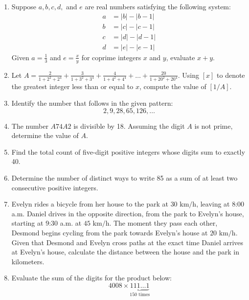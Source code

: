 \documentclass{article}
\begin{document}
\begin{enumerate}
    \item Suppose $a, b, c, d,$ and $e$ are real numbers satisfying the following system:
    \begin{align*}
        a &= |b| - |b-1| \\
        b &= |c| - |c-1| \\
        c &= |d| - |d-1| \\
        d &= |e| - |e-1|
    \end{align*}
    Given $a = \frac{1}{3}$ and $e = \frac{x}{y}$ for coprime integers $x$ and $y$, evaluate $x+y$.

    \item Let $A = \frac{2}{1+2^2+2^4} + \frac{3}{1+3^2+3^4} + \frac{4}{1+4^2+4^4} + \dots + \frac{20}{1+20^2+20^4}$. Using $[x]$ to denote the greatest integer less than or equal to $x$, compute the value of $[1/A]$.

    \item Identify the number that follows in the given pattern:
    \[ 2, 9, 28, 65, 126, \dots \]

    \item The number $A74A2$ is divisible by 18. Assuming the digit $A$ is not prime, determine the value of $A$.

    \item Find the total count of five-digit positive integers whose digits sum to exactly 40.

    \item Determine the number of distinct ways to write 85 as a sum of at least two consecutive positive integers.

    \item Evelyn rides a bicycle from her house to the park at $30\text{ km/h}$, leaving at 8:00 a.m. Daniel drives in the opposite direction, from the park to Evelyn's house, starting at 9:30 a.m. at $45\text{ km/h}$. The moment they pass each other, Desmond begins cycling from the park towards Evelyn's house at $20\text{ km/h}$. Given that Desmond and Evelyn cross paths at the exact time Daniel arrives at Evelyn's house, calculate the distance between the house and the park in kilometers.

    \item Evaluate the sum of the digits for the product below:
    \[ 4008 \times \underbrace{111\dots1}_{150 \text{ times}} \]


\end{enumerate}
\end{document}
